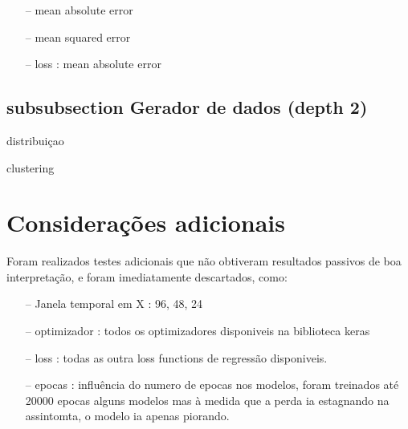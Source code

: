 \begin{itemize}
    \item[--] mean absolute error
    \item[--] mean squared error    
    \item[--] loss : mean absolute error

\end{itemize}



\subsection{subsubsection Gerador de dados (depth 2)}
distribuiçao

clustering


\section{Considerações adicionais  \label{se:dados_plus}}

Foram realizados testes adicionais que não obtiveram resultados passivos de boa interpretação, e foram imediatamente descartados, como:

\begin{itemize}
    \item[--] Janela temporal em X : 96, 48, 24
    \item[--] optimizador : todos os optimizadores disponiveis na biblioteca keras
    \item[--] loss : todas as outra loss functions de regressão disponiveis.
    \item[--] epocas : influência do numero de epocas nos modelos, foram treinados até 20000 epocas alguns modelos mas à medida que a perda ia estagnando na assintomta, o modelo ia apenas piorando.
\end{itemize}

